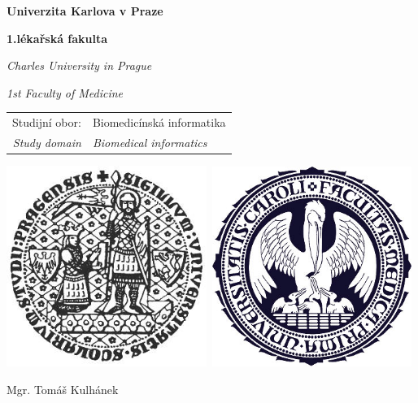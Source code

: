 \begin{center}
\large
\textbf{\Large{Univerzita Karlova v Praze}}

\textbf{\Large{1.lékařská fakulta}} 

\textit{Charles University in Prague} 

\textit{1st Faculty of Medicine}
\vfill
\normalsize
\begin{tabular}{rl}
Studijní obor:  & Biomedicínská informatika \\
\noalign{\vspace{-1mm}}
\textit{Study domain} & \textit{Biomedical informatics} \\
\end{tabular}

\vfill

\vspace{10mm}

\centerline{\mbox{\includegraphics[width=65mm]{img/logouk.jpg}
\includegraphics[width=65mm]{img/logolf1.jpg}}}

\vfill
\vspace{10mm}

{\Large Mgr. Tomáš Kulhánek}


\end{center}
